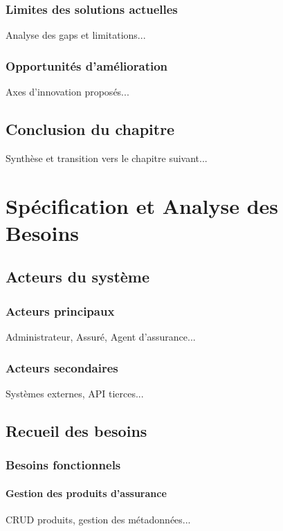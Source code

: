 \documentclass[12pt,a4paper]{report}
\begin{document}
\subsection{Limites des solutions actuelles}
Analyse des gaps et limitations...

\subsection{Opportunités d'amélioration}
Axes d'innovation proposés...

\section{Conclusion du chapitre}
Synthèse et transition vers le chapitre suivant...

\chapter{Spécification et Analyse des Besoins}
\label{chap:besoins}

\section{Acteurs du système}
\subsection{Acteurs principaux}
Administrateur, Assuré, Agent d'assurance...

\subsection{Acteurs secondaires}
Systèmes externes, API tierces...

\section{Recueil des besoins}
\subsection{Besoins fonctionnels}
\subsubsection{Gestion des produits d'assurance}
CRUD produits, gestion des métadonnées...
\end{document}

